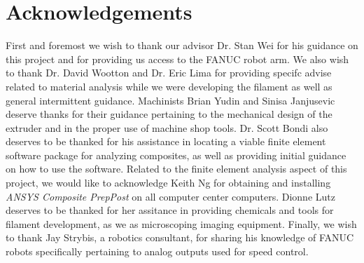 \section{Acknowledgements}

\indent

First and foremost we wish to thank our advisor Dr. Stan Wei for his guidance on this project and for providing us access to the FANUC robot arm. We also wish to thank Dr. David Wootton and Dr. Eric Lima for providing specifc advise related to material analysis while we were developing the filament as well as general intermittent guidance. Machinists Brian Yudin and Sinisa Janjusevic deserve thanks for their guidance pertaining to the mechanical design of the extruder and in the proper use of machine shop tools. Dr. Scott Bondi also deserves to be thanked for his assistance in locating a viable finite element software package for analyzing composites, as well as providing initial guidance on how to use the software. Related to the finite element analysis aspect of this project, we would like to acknowledge Keith Ng for obtaining and installing \emph{ANSYS Composite PrepPost} on all computer center computers. Dionne Lutz deserves to be thanked for her assitance in providing chemicals and tools for filament development, as we as microscoping imaging equipment. Finally, we wish to thank Jay Strybis, a robotics consultant, for sharing his knowledge of FANUC robots specifically pertaining to analog outputs used for speed control.\\

